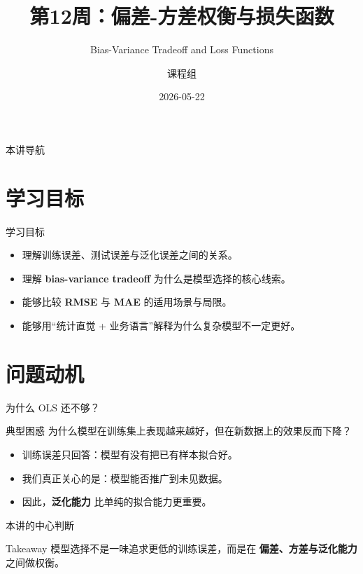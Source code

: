 \documentclass[aspectratio=169,professionalfonts]{beamer}
\title[第12周]{第12周：偏差-方差权衡与损失函数}
\subtitle{Bias-Variance Tradeoff and Loss Functions}
\author[课程组]{课程组}
\institute[OUC]{中国海洋大学 \quad Regression Analysis 2026}
\date{2026-05-22}
\begin{document}
\begin{frame}[plain]
    \titlepage
\end{frame}

\begin{frame}{本讲导航}
    \tableofcontents
\end{frame}

\section{学习目标}

\begin{frame}{学习目标}
    \begin{itemize}
        \item 理解训练误差、测试误差与泛化误差之间的关系。
        \item 理解 \textbf{bias-variance tradeoff} 为什么是模型选择的核心线索。
        \item 能够比较 \textbf{RMSE} 与 \textbf{MAE} 的适用场景与局限。
        \item 能够用“统计直觉 + 业务语言”解释为什么复杂模型不一定更好。
    \end{itemize}
\end{frame}

\section{问题动机}

\begin{frame}{为什么 OLS 还不够？}
    \begin{block}{典型困惑}
        为什么模型在训练集上表现越来越好，但在新数据上的效果反而下降？
    \end{block}

    \vspace{0.5em}
    \begin{itemize}
        \item 训练误差只回答：模型有没有把已有样本拟合好。
        \item 我们真正关心的是：模型能否推广到未见数据。
        \item 因此，\textbf{泛化能力} 比单纯的拟合能力更重要。
    \end{itemize}
\end{frame}

\begin{frame}{本讲的中心判断}
    \begin{alertblock}{Takeaway}
        模型选择不是一味追求更低的训练误差，而是在 \textbf{偏差、方差与泛化能力} 之间做权衡。
    \end{alertblock}
\end{frame}
\end{document}
